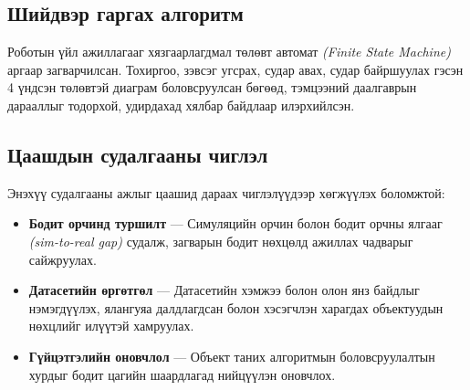 \subsection{Шийдвэр гаргах алгоритм}

Роботын үйл ажиллагааг хязгаарлагдмал төлөвт автомат \textit{(Finite State Machine)} аргаар загварчилсан. Тохиргоо, зэвсэг угсрах, судар авах, судар байршуулах гэсэн 4 үндсэн төлөвтэй диаграм боловсруулсан бөгөөд, тэмцээний даалгаврын дарааллыг тодорхой, удирдахад хялбар байдлаар илэрхийлсэн.

\subsection{Цаашдын судалгааны чиглэл}

Энэхүү судалгааны ажлыг цаашид дараах чиглэлүүдээр хөгжүүлэх боломжтой:

\begin{itemize}
    \item \textbf{Бодит орчинд туршилт} --- Симуляцийн орчин болон бодит орчны ялгааг \textit{(sim-to-real gap)} судалж, загварын бодит нөхцөлд ажиллах чадварыг сайжруулах.
    \item \textbf{Датасетийн өргөтгөл} --- Датасетийн хэмжээ болон олон янз байдлыг нэмэгдүүлэх, ялангуяа далдлагдсан болон хэсэгчлэн харагдах объектуудын нөхцлийг илүүтэй хамруулах.
    \item \textbf{Гүйцэтгэлийн оновчлол} --- Объект таних алгоритмын боловсруулалтын хурдыг бодит цагийн шаардлагад нийцүүлэн оновчлох.
\end{itemize}

